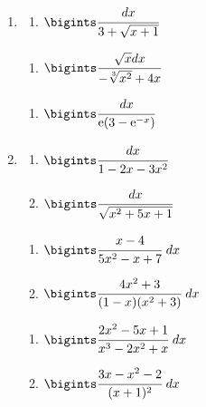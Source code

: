 \documentclass{article}
\begin{document}
\begin{multicols}{2}
\begin{enumerate}[label=\Roman*.]
		\item
		\begin{multicols}{3}
			\begin{enumerate}[label=\arabic*.]
				\setlength\itemsep{1em}
				\item $\bigints\cfrac{dx}{3 + \sqrt{x +1}}$
			\end{enumerate}
			\vfill\null\columnbreak
			\begin{enumerate}[label=\arabic*., start=2]
				\setlength\itemsep{1em}
				\item $\bigints\cfrac{\sqrt{x}dx}{-\sqrt[3]{x^2}+4x}$
			\end{enumerate}
			\vfill\null\columnbreak
			\begin{enumerate}[label=\arabic*., start=3]
				\setlength\itemsep{1em}
				\item $\bigints\cfrac{dx}{\mbox{e}(3- \mbox{e}^{-x})}$
			\end{enumerate}
			\vfill\null\columnbreak
		\end{multicols}
		
		\item
		\begin{multicols}{3}
			\begin{enumerate}[label=\arabic*.]
				\setlength\itemsep{1em}
				\item $\bigints\cfrac{dx}{1-2x-3x^2}$
				\item $\bigints\cfrac{dx}{\sqrt{x^2+5x+1}}$
			\end{enumerate}
			\vfill\null\columnbreak
			\begin{enumerate}[label=\arabic*., start=3]
				\setlength\itemsep{1em}
				\item $\bigints\cfrac{x-4}{5x^2-x+7}\ dx$
				\item $\bigints\cfrac{4x^2+3}{(1-x)(x^2+3)}\ dx$
			\end{enumerate}
			\vfill\null\columnbreak
			\begin{enumerate}[label=\arabic*., start=5]
				\setlength\itemsep{1em}
				\item $\bigints\cfrac{2x^2-5x+1}{x^3-2x^2+x}\ dx$
				\item $\bigints\cfrac{3x-x^2-2}{(x+1)^2}\ dx$
			\end{enumerate}
			\vfill\null\columnbreak
		\end{multicols}
		

\end{enumerate}
\end{multicols}
\end{document}
